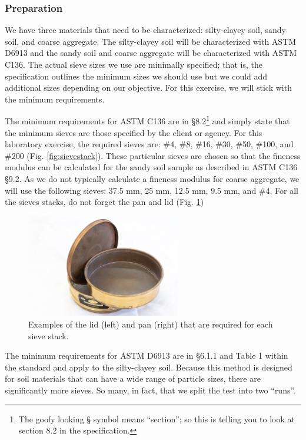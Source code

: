 \documentclass[12pt]{article}
\begin{document}
\subsubsection{Preparation}
We have three materials that need to be characterized: silty-clayey soil, sandy soil, and coarse aggregate. The silty-clayey soil will be characterized with ASTM D6913 and the sandy soil and coarse aggregate will be characterized with ASTM C136. The actual sieve sizes we use are minimally specified; that is, the specification outlines the minimum sizes we should use but we could add additional sizes depending on our objective. For this exercise, we will stick with the minimum requirements.

The minimum requirements for ASTM C136 are in \S8.2\footnote{The goofy looking \S{} symbol means ``section''; so this is telling you to look at section 8.2 in the specification.} and simply state that the minimum sieves are those specified by the client or agency. For this laboratory exercise, the required sieves are: \#4, \#8, \#16, \#30, \#50, \#100, and \#200 (Fig. \ref{fig:sievestack}). These particular sieves are chosen so that the fineness modulus can be calculated for the sandy soil sample as described in ASTM C136 \S9.2. As we do not typically calculate a fineness modulus for coarse aggregate, we will use the following sieves: 37.5 mm, 25 mm, 12.5 mm, 9.5 mm, and \#4. For all the sieves stacks, do not forget the pan and lid (Fig. \ref{fig:panlid})

\begin{figure}[H]
    \centering
    \includegraphics[width=0.6\textwidth]{GEO_5701.jpg}
    \caption{Examples of the lid (left) and pan (right) that are required for each sieve stack.}
    \label{fig:panlid}
\end{figure}

The minimum requirements for ASTM D6913 are in \S6.1.1 and Table 1 within the standard and apply to the silty-clayey soil. Because this method is designed for soil materials that can have a wide range of particle sizes, there are significantly more sieves. So many, in fact, that we split the test into two ``runs''.
\end{document}
